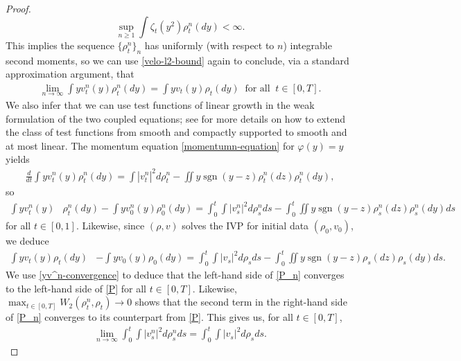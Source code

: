 \documentclass[11pt]{article}
\numberwithin{equation}{section}
\DeclareMathOperator{\sgn}{sgn}
\begin{document}
\begin{proof}
            $$\sup_{n\geq1}\int\zeta_t(y^2)\rho^n_t(dy)<\infty.$$
            This implies the sequence $\{\rho^n_t\}_n$ has uniformly (with respect to $n$) integrable second moments, so we can use \eqref{velo-l2-bound} again to conclude, via a standard approximation argument, that
            \begin{align}\label{yv^n-convergence}
                \lim_{n\to\infty}\int yv_t^n(y)\rho_t^n(dy)=\int yv_t(y)\rho_t(dy)\ \mbox{ for all }\ t\in[0,T].
            \end{align}
            We also infer that we can use test functions of linear growth in the weak formulation of the two coupled equations; see \cite{Suder-Tudorascu} for more details on how to extend the class of test functions from smooth and compactly supported to smooth and at most linear. 
            The momentum equation \eqref{momentumn-equation} for $\varphi(y)=y$ yields  
            \begin{align*}
                \frac{d}{dt}\int yv_t^n(y)\rho_t^n(dy)=\int|v_t^n|^2d\rho_t^n-\iint y\sgn(y-z)\rho_t^n(dz)\rho_t^n(dy),
            \end{align*}
            so 
            \begin{align}\label{P_n}
                \int \! yv_t^n(y)&\rho_t^n(dy)-\int \! yv_0^n(y)\rho_0^n(dy)
                = \int_0^t \!\! \int \! |v_s^n|^2d\rho_s^n ds-\int_0^t \!\! \iint \! y\sgn(y-z)\rho_s^n(dz)\rho_s^n(dy)ds
            \end{align}
            for all $t\in[0,1]$. Likewise, since $(\rho,v)$ solves the IVP for initial data $(\rho_0,v_0)$, we deduce 
            \begin{align}\label{P}
                \int \! yv_t(y)\rho_t(dy)&-\int \! yv_0(y)\rho_0(dy)
                =\int_0^t \!\! \int \! |v_s|^2d\rho_sds-\int_0^t \!\! \iint \! y\sgn(y-z)\rho_s(dz)\rho_s(dy)ds. 
            \end{align}
            We use \eqref{yv^n-convergence} to deduce that the left-hand side of \eqref{P_n} converges to the left-hand side of \eqref{P} for all $t\in[0,T]$. Likewise, $\max_{t\in[0,T]}W_2(\rho^n_t,\rho_t)\rightarrow0$ shows that the second term in the right-hand side of \eqref{P_n} converges to its counterpart from \eqref{P}. This gives us, for all $t\in[0,T]$,
            \begin{align*}
                \lim_{n\to\infty}\int_0^t \!\! \int|v_s^n|^2d\rho_s^nds=\int_0^t \!\! \int|v_s|^2d\rho_sds. 

\end{align*}
\end{proof}
\end{document}
